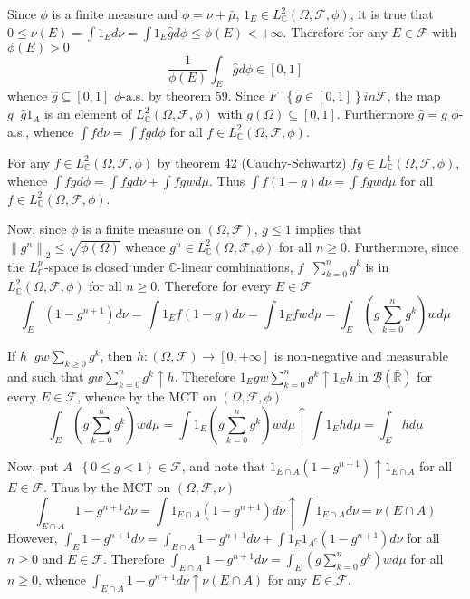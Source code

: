 \documentclass[a4paper]{article}
\newcommand{\obj}[1]{\left\{ #1 \right \}}
\newcommand{\clo}[1]{\left [ #1 \right ]}
\newcommand{\brac}[1]{\left ( #1 \right )}
\newcommand{\nrm}[1]{\left\| #1 \right \|}
\newcommand{\Rbar}{{\bar{\mathbb{R}}}}
\newcommand{\Zinf}{\clo{ 0, +\infty }}
\newcommand{\Cplx}{\mathbb{C}}
\newcommand{\Fcal}{\mathcal{F}}
\newcommand{\borel}[1]{\mathcal{B}\brac{#1}}
\newcommand{\defn}{\mathop{\overset{\Delta}{=}}\nolimits}
\begin{document}
Since $\phi$ is a finite measure and $\phi = \nu + \bar{\mu}$, $1_E\in L^2_\Cplx\brac{\Omega, \Fcal, \phi}$, it is true that $0\leq \nu\brac{E} = \int 1_E d\nu = \int 1_E \hat{g} d\phi \leq \phi\brac{E}<+\infty$. Therefore for any $E\in \Fcal$ with $\phi\brac{E}>0$ \[\frac{1}{\phi\brac{E}} \int_E \hat{g} d\phi \in \clo{0,1}\] whence $\hat{g}\subseteq \clo{0,1}$ $\phi$-a.s. by theorem 59. Since $F\defn \obj{\hat{g}\in \clo{0,1}}in \Fcal$, the map $g\defn \hat{g} 1_A$ is an element of $L^2_\Cplx\brac{\Omega, \Fcal, \phi}$ with $g\brac{\Omega}\subseteq \clo{0,1}$. Furthermore $\hat{g}=g$ $\phi$-a.s., whence $\int f d\nu = \int f g d\phi$ for all $f\in L^2_\Cplx\brac{\Omega, \Fcal, \phi}$.

For any $f\in L^2_\Cplx\brac{\Omega, \Fcal, \phi}$ by theorem 42 (Cauchy-Schwartz) $f g \in L^1_\Cplx\brac{\Omega, \Fcal, \phi}$, whence $\int f g d\phi = \int f g d\nu + \int f g w d\mu$. Thus $\int f \brac{1 - g} d\nu = \int f g w d\mu$ for all $f\in L^2_\Cplx\brac{\Omega, \Fcal, \phi}$.

Now, since $\phi$ is a finite measure on $\brac{\Omega, \Fcal}$, $g\leq 1$ implies that $\nrm{g^n}_2\leq \sqrt{\phi\brac{\Omega}}$ whence $g^n \in L^2_\Cplx\brac{\Omega, \Fcal, \phi}$ for all $n\geq 0$. Furthermore, since the $L^p_\Cplx$-space is closed under $\Cplx$-linear combinations, $f\defn \sum_{k=0}^n g^k$ is in $L^2_\Cplx\brac{\Omega, \Fcal, \phi}$ for all $n\geq 0$. Therefore for every $E\in \Fcal$ \[\int_E \brac{1-g^{n+1}} d\nu = \int 1_E f \brac{1-g} d\nu = \int 1_E f w d\mu = \int_E \brac{g \sum_{k=0}^n g^k} w d\mu\]

If $h\defn g w \sum_{k\geq 0} g^k$, then $h:\brac{\Omega, \Fcal}\to\Zinf$ is non-negative and measurable and such that $g w \sum_{k=0}^n g^k \uparrow h$. Therefore $1_E g w \sum_{k=0}^n g^k \uparrow 1_E h$ in $\borel{\Rbar}$ for every $E\in \Fcal$, whence by the MCT on $\brac{\Omega, \Fcal, \phi}$ \[\int_E \brac{g \sum_{k=0}^n g^k} w d\mu = \int 1_E \brac{g \sum_{k=0}^n g^k} w d\mu \uparrow \int 1_E h d\mu = \int_E h d\mu\]

Now, put $A\defn \obj{0\leq g<1}\in \Fcal$, and note that $1_{E\cap A} \brac{1-g^{n+1}}\uparrow 1_{E\cap A}$ for all $E\in \Fcal$. Thus by the MCT on $\brac{\Omega, \Fcal, \nu}$ \[\int_{E\cap A} 1-g^{n+1} d\nu = \int 1_{E\cap A} \brac{1-g^{n+1}} d\nu \uparrow \int 1_{E\cap A} d\nu = \nu\brac{E\cap A}\] However, $\int_E 1-g^{n+1} d\nu = \int_{E\cap A} 1-g^{n+1} d\nu + \int 1_E 1_{A^c} \brac{1-g^{n+1}} d\nu$ for all $n\geq 0$ and $E\in \Fcal$. Therefore $\int_{E\cap A} 1-g^{n+1} d\nu = \int_E \brac{g \sum_{k=0}^n g^k} w d\mu$ for all $n\geq 0$, whence $\int_{E\cap A} 1-g^{n+1} d\nu \uparrow \nu\brac{E\cap A}$ for any $E\in \Fcal$.
\end{document}
